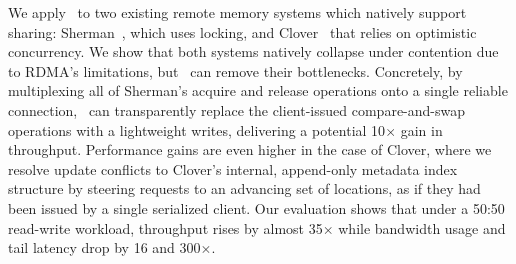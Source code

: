 We apply \sword\ to two existing remote memory systems which natively
support sharing: Sherman~\cite{sherman}, which uses locking, and Clover~\cite{clover} that relies on optimistic concurrency.
We show that both systems natively collapse under contention due to RDMA's
limitations, but \sword\ can remove their bottlenecks.  Concretely, 
by multiplexing all of Sherman's acquire and release operations onto a
single reliable connection, \sword\ can transparently replace the
client-issued compare-and-swap operations with a lightweight writes,
delivering a potential 10$\times$ gain in throughput.  Performance gains are even higher in the case of Clover, where
we resolve update conflicts to Clover's internal, append-only metadata
index structure by steering requests to an advancing set of locations,
as if they had been issued by a single serialized client.
Our evaluation shows that
under a 50:50 read-write workload, throughput
rises by almost 35$\times$ while bandwidth usage and tail
latency drop by 16 and 300$\times$.



